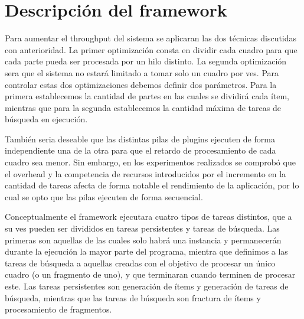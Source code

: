 
\section{Descripción del framework}

Para aumentar el throughput del sistema se aplicaran las dos técnicas discutidas
con anterioridad. La primer optimización consta en dividir cada cuadro para que
cada parte pueda ser procesada por un hilo distinto. La segunda optimización
sera que el sistema no estará limitado a tomar solo un cuadro por ves. Para
controlar estas dos optimizaciones debemos definir dos parámetros. Para la
primera establecemos la cantidad de partes en las cuales se dividirá cada ítem,
mientras que para la segunda establecemos la cantidad máxima de tareas de
búsqueda en ejecución.

También seria deseable que las distintas pilas de plugins ejecuten de forma
independiente una de la otra para que el retardo de procesamiento de cada cuadro
sea menor. Sin embargo, en los experimentos realizados se comprobó que el
overhead y la competencia de recursos introducidos por el incremento en la
cantidad de tareas afecta de forma notable el rendimiento de la aplicación, por
lo cual se opto que las pilas ejecuten de forma secuencial.

Conceptualmente el framework ejecutara cuatro tipos de tareas distintos, que a
su ves pueden ser divididos en tareas persistentes y tareas de búsqueda. Las
primeras son aquellas de las cuales solo habrá una instancia y permanecerán
durante la ejecución la mayor parte del programa, mientra que definimos a las
tareas de búsqueda a aquellas creadas con el objetivo de procesar un único
cuadro (o un fragmento de uno), y que terminaran cuando terminen de procesar
este. Las tareas persistentes son generación de ítems y generación de tareas de
búsqueda, mientras que las tareas de búsqueda son fractura de ítems y
procesamiento de fragmentos.

